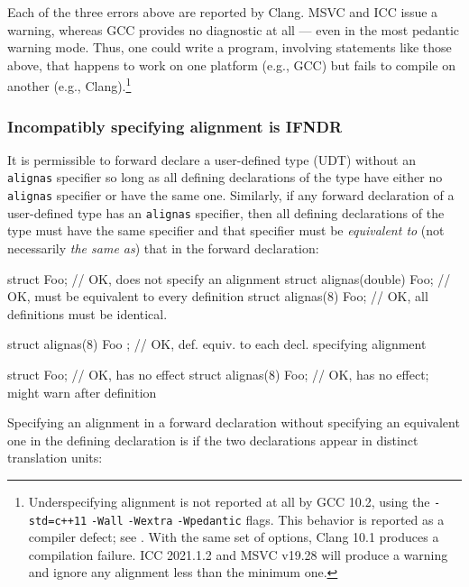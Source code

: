 \noindent Each of the three errors above are reported by Clang. MSVC and ICC issue a warning, whereas
 GCC
provides no diagnostic at all ---
even in the most pedantic warning mode. Thus, one could write a program,
involving statements like those above, that happens to work on one
platform (e.g., GCC) but fails to compile on another (e.g.,
Clang).{\cprotect\footnote{Underspecifying alignment is not reported at
all by GCC 10.2, using the
\lstinline!-std=c++11! \lstinline!-Wall! \lstinline!-Wextra! \mbox{\lstinline!-Wpedantic!}
flags. This behavior is reported as a compiler defect; see \cite{wakely15}. With the same set of options, Clang 10.1 produces a compilation
failure. ICC 2021.1.2 and MSVC v19.28 will produce a warning and ignore any alignment
  less than the minimum one.}}

\subsubsection[Incompatibly specifying alignment is IFNDR]{Incompatibly specifying alignment is IFNDR}\label{incompatibly-specifying-alignment-is-ifndr}

It is permissible to forward declare a user-defined type (UDT)
without an \lstinline!alignas! specifier so long as all defining
declarations of the type have either no \lstinline!alignas! specifier or
have the same one. Similarly, if any forward declaration of a
user-defined type has an \lstinline!alignas! specifier, then all defining
declarations of the type must have the same specifier and that specifier
must be \emph{equivalent to} (not necessarily \emph{the same as}) that
in the forward declaration:

\begin{emcppslisting}
struct Foo;                  // OK, does not specify an alignment
struct alignas(double) Foo;  // OK, must be equivalent to every definition
struct alignas(8) Foo;       // OK, all definitions must be identical.

struct alignas(8) Foo { };   // OK, def. equiv. to each decl. specifying alignment

struct Foo;                  // OK, has no effect
struct alignas(8) Foo;       // OK, has no effect; might warn after definition
\end{emcppslisting}
    
\noindent Specifying an alignment in a forward declaration without specifying an
equivalent one in the defining declaration is  if the two declarations appear in distinct translation
units:

